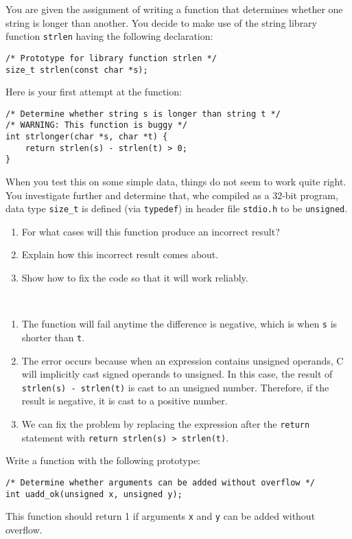 \documentclass[12pt]{article}
\newenvironment{ex}[2][Exercise]{\begin{trivlist}
		\item[\hskip \labelsep {\bfseries #1}\hskip \labelsep {\bfseries #2.}]}{\end{trivlist}}
\newenvironment{sol}[1][Solution]{\begin{trivlist}
		\item[\hskip \labelsep {\bfseries #1:}]}{\end{trivlist}}
\begin{document}
\begin{ex}{2.26}
	You are given the assignment of writing a function that determines whether one string is
	longer than another. You decide to make use of the string library function \texttt{strlen}
	having the following declaration:
	\begin{lstlisting}
/* Prototype for library function strlen */
size_t strlen(const char *s);
	\end{lstlisting}
	Here is your first attempt at the function:
	\begin{lstlisting}
/* Determine whether string s is longer than string t */
/* WARNING: This function is buggy */
int strlonger(char *s, char *t) {
	return strlen(s) - strlen(t) > 0;
}
	\end{lstlisting}
	When you test this on some simple data, things do not seem to work quite right. You
	investigate further and determine that, whe compiled as a 32-bit program, data type
	\texttt{size\_t} is defined (via \texttt{typedef}) in header file \texttt{stdio.h} to
	be \texttt{unsigned}.
	\begin{enumerate}[label=(\alph*)]
		\item For what cases will this function produce an incorrect result?
		\item Explain how this incorrect result comes about.
		\item Show how to fix the code so that it will work reliably.
	\end{enumerate}
\end{ex}

\begin{sol}
	\
	\begin{enumerate}[label=(\alph*)]
		\item The function will fail anytime the difference is negative, which is when
		\texttt{s} is shorter than \texttt{t}.
		\item The error occurs because when an expression contains unsigned operands,
		C will implicitly cast signed operands to unsigned. In this case, the result of \texttt{strlen(s) - strlen(t)} is cast to an unsigned number. Therefore, if the result is negative, it is
		cast to a positive number. 
		\item We can fix the problem by replacing the expression after the \texttt{return} statement
		with \texttt{return strlen(s) > strlen(t)}.
	\end{enumerate}
\end{sol}

\begin{ex}{2.27}
	Write a function with the following prototype:
	\begin{lstlisting}
/* Determine whether arguments can be added without overflow */
int uadd_ok(unsigned x, unsigned y);
	\end{lstlisting}
	This function should return 1 if arguments \texttt{x} and \texttt{y} can be
	added without overflow.
\end{ex}
\end{document}
